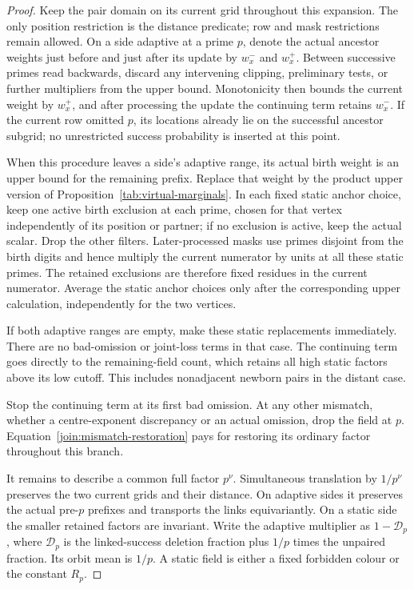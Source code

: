 \begin{proof}
Keep the pair domain on its current grid throughout this expansion.
The only position restriction is the distance predicate; row and mask
restrictions remain allowed. On a side adaptive at a prime $p$, denote
the actual ancestor weights just before and just after its update by
$w_x^-$ and $w_x^+$. Between successive primes read backwards, discard
any intervening clipping, preliminary tests, or further multipliers
from the upper bound. Monotonicity then bounds the current weight by
$w_x^+$, and after processing the update the continuing term retains
$w_x^-$. If the current row omitted $p$, its locations already lie on
the successful ancestor subgrid; no unrestricted success probability
is inserted at this point.

When this procedure leaves a side's adaptive range, its actual birth
weight is an upper bound for the remaining prefix. Replace that weight
by the product upper version of Proposition~\ref{tab:virtual-marginals}.
In each fixed static anchor choice, keep one active birth exclusion at
each prime, chosen for that vertex independently of its position or
partner; if no exclusion is active, keep the actual scalar. Drop the
other filters. Later-processed masks use primes disjoint from the birth
digits and hence multiply the current numerator by units at all these
static primes. The retained exclusions are therefore fixed residues
in the current numerator. Average the static anchor choices only after
the corresponding upper calculation, independently for the two
vertices.

If both adaptive ranges are empty, make these static replacements
immediately. There are no bad-omission or joint-loss terms in
that case. The continuing term goes directly to the remaining-field
count, which retains all high static factors above its low cutoff.
This includes nonadjacent newborn pairs in the distant case.

Stop the continuing term at its first bad omission. At any other
mismatch, whether a centre-exponent discrepancy or an actual omission,
drop the field at $p$. Equation~\eqref{join:mismatch-restoration} pays
for restoring its ordinary factor throughout this branch.

It remains to describe a common full factor $p^\nu$. Simultaneous
translation by $1/p^\nu$ preserves the two current grids and their
distance. On adaptive sides it preserves the actual pre-$p$ prefixes
and transports the links equivariantly. On a static side the smaller
retained factors are invariant. Write the adaptive multiplier as
$1-\mathcal D_p$, where $\mathcal D_p$ is the linked-success deletion
fraction plus $1/p$ times the unpaired fraction. Its orbit mean is
$1/p$. A static field is either a fixed forbidden colour or the
constant $R_p$.


\end{proof}

